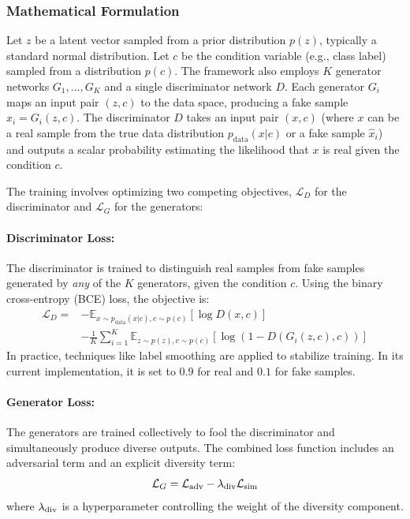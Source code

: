\subsubsection{Mathematical Formulation}
\label{theoretical_cmadgan_math}

Let \( z \) be a latent vector sampled from a prior distribution \( p(z) \), typically a standard normal distribution. Let \( c \) be the condition variable (e.g., class label) sampled from a distribution \( p(c) \). The framework also employs \( K \) generator networks \( G_1, \dots, G_K \) and a single discriminator network \( D \). Each generator \( G_i \) maps an input pair \( (z, c) \) to the data space, producing a fake sample \( \hat{x}_i = G_i(z, c) \). The discriminator \( D \) takes an input pair \( (x, c) \) (where \( x \) can be a real sample from the true data distribution \( p_{\text{data}}(x|c) \) or a fake sample \( \hat{x}_i \)) and outputs a scalar probability estimating the likelihood that \( x \) is real given the condition \( c \).

The training involves optimizing two competing objectives, \( \mathcal{L}_D \) for the discriminator and \( \mathcal{L}_G \) for the generators:

\paragraph{Discriminator Loss:}
The discriminator is trained to distinguish real samples from fake samples generated by \textit{any} of the \( K \) generators, given the condition \( c \). Using the binary cross-entropy (BCE) loss, the objective is:
\begin{equation}
\label{eq:cmadgan_loss_d}
\begin{split}
\mathcal{L}_D = & - \mathbb{E}_{x \sim p_{\text{data}}(x|c), c \sim p(c)} [\log D(x, c)] \\
& - \frac{1}{K} \sum_{i=1}^{K} \mathbb{E}_{z \sim p(z), c \sim p(c)} [\log(1 - D(G_i(z, c), c))]
\end{split}
\end{equation}
In practice, techniques like label smoothing are applied to stabilize training. In its current implementation, it is set to \(0.9\) for real and \(0.1\) for fake samples.

\paragraph{Generator Loss:}
The generators are trained collectively to fool the discriminator and simultaneously produce diverse outputs. The combined loss function includes an adversarial term and an explicit diversity term:
\begin{equation}
\label{eq:cmadgan_loss_g}
\mathcal{L}_G = \mathcal{L}_{\text{adv}} - \lambda_{\text{div}} \mathcal{L}_{\text{sim}}
\end{equation}
where \( \lambda_{\text{div}} \) is a hyperparameter controlling the weight of the diversity component.

